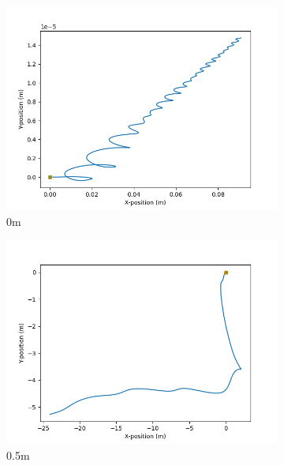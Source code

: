 \documentclass[class=article, crop=false]{standalone}
\begin{document}
\begin{figure}
    \centering
    \begin{subfigure}[b]{0.48\textwidth}
        \centering
        \includegraphics{scenario1/rov-100m/0.0m/usv_position_uncontrolled}
        \caption{0m}
        \label{}
    \end{subfigure}
    \hfill
    \begin{subfigure}[b]{0.48\textwidth}
        \centering
        \includegraphics{scenario1/rov-100m/0.5m/usv_position_uncontrolled}
        \caption{0.5m}
        \label{}
    \end{subfigure}
    \vfill
    \begin{subfigure}[b]{0.48\textwidth}
        \centering

\end{subfigure}
\end{figure}
\end{document}

